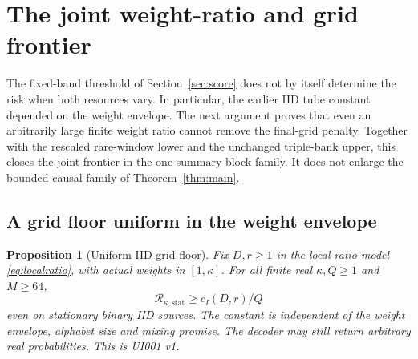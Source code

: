 \documentclass[11pt,letterpaper]{article}
\newtheorem{proposition}[theorem]{Proposition}
\theoremstyle{definition}\newtheorem{definition}[theorem]{Definition}
\theoremstyle{remark}\newtheorem{remark}[theorem]{Remark}
\newcommand{\Risk}{\mathcal{R}}
\newcommand{\unit}[1]{\textsf{#1}}
\begin{document}
\section{The joint weight-ratio and grid frontier}\label{sec:joint}
The fixed-band threshold of Section~\ref{sec:score} does not by itself determine the risk when both resources vary. In particular, the earlier IID tube constant depended on the weight envelope. The next argument proves that even an arbitrarily large finite weight ratio cannot remove the final-grid penalty. Together with the rescaled rare-window lower and the unchanged triple-bank upper, this closes the joint frontier in the one-summary-block family. It does not enlarge the bounded causal family of Theorem~\ref{thm:main}.

\subsection{A grid floor uniform in the weight envelope}
\begin{proposition}[Uniform IID grid floor]\label{prop:iiduniform}
Fix $D,r\ge1$ in the local-ratio model \eqref{eq:localratio}, with actual weights in $[1,\kappa]$. For all finite real $\kappa,Q\ge1$ and $M\ge64$,
\[
 \Risk_{\kappa,\mathrm{stat}}\ge c_I(D,r)/Q
\]
even on stationary binary IID sources. The constant is independent of the weight envelope, alphabet size and mixing promise. The decoder may still return arbitrary real probabilities. This is \unit{UI001 v1}.
\end{proposition}
\end{document}
